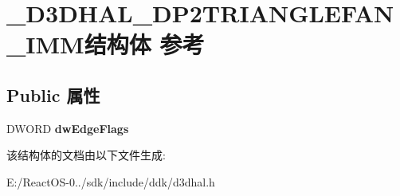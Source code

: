 \hypertarget{struct___d3_d_h_a_l___d_p2_t_r_i_a_n_g_l_e_f_a_n___i_m_m}{}\section{\+\_\+\+D3\+D\+H\+A\+L\+\_\+\+D\+P2\+T\+R\+I\+A\+N\+G\+L\+E\+F\+A\+N\+\_\+\+I\+M\+M结构体 参考}
\label{struct___d3_d_h_a_l___d_p2_t_r_i_a_n_g_l_e_f_a_n___i_m_m}
\subsection*{Public 属性}
\begin{DoxyCompactItemize}
\item 
\mbox{\label{struct___d3_d_h_a_l___d_p2_t_r_i_a_n_g_l_e_f_a_n___i_m_m_afede36f82422bf83fc27032eed4f6185}} 
D\+W\+O\+RD {\bfseries dw\+Edge\+Flags}
\end{DoxyCompactItemize}


该结构体的文档由以下文件生成\+:\begin{DoxyCompactItemize}
\item 
E\+:/\+React\+O\+S-\/0../sdk/include/ddk/d3dhal.\+h\end{DoxyCompactItemize}
